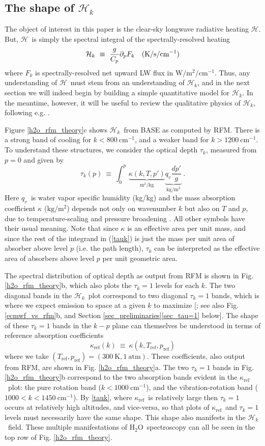 \documentclass{ametsoc}
\newcommand{\beqn}{\begin{equation}}
\newcommand{\eeqn}{\end{equation}}
\newcommand{\eqnref}[1]{(\ref{#1})}
\newcommand{\kg}{\ensuremath{\mathrm{kg}}}
\newcommand{\meter}{\ensuremath{\mathrm{m}}}
\newcommand{\Kelvin}{\ensuremath{\mathrm{K}}}
\newcommand{\Wmsq}{\ensuremath{\mathrm{W/m^2}}}
\newcommand{\cminverse}{\ensuremath{\mathrm{cm^{-1}}}}
\newcommand{\ppp}{\ensuremath{\partial_p}}
\newcommand{\Cp}{\ensuremath{C_p}}
\newcommand{\qv}{\ensuremath{q_v}}
\newcommand{\htwo}{\ensuremath{\mathrm{H_2O}}}
\newcommand{\ch}{\ensuremath{\mathcal{H}}}
\newcommand{\chk}{\ensuremath{\ch_k}}
\newcommand{\tauk}{\ensuremath{\tau_k}}
\newcommand{\kapparef}{\ensuremath{\kappa_{\mathrm{ref}}}}
\newcommand{\Tref}{\ensuremath{T_{\mathrm{ref}}}}
\newcommand{\pref}{\ensuremath{p_{\mathrm{ref}}}}
\begin{document}
\subsection{The shape of \chk}
The object of interest in this paper is the clear-sky longwave radiative heating \ch. But, \ch\ is simply the spectral integral of  the spectrally-resolved heating 
\beqn
	\ch_k \ \equiv \ \frac{g}{\Cp} \ppp F_k \quad \text{(K/s/\cminverse)}
	\label{heat_k}
\eeqn
where $F_k$ is spectrally-resolved net upward LW flux in $\Wmsq/\cminverse$. Thus,  any understanding of \ch\ must stem from an understanding of \chk, and in the next section we will indeed begin by building a simple quantitative model for \chk.  In the meantime, however, it will be useful to review the qualitative physics of \chk, following e.g.  \cite{harries2008,clough1992}.

Figure \ref{h2o_rfm_theory}c shows \chk\ from BASE as computed by RFM. There is a strong band of cooling for $k< 800\ \cminverse$, and a weaker band for $k > 1200\ \cminverse$. To understand these structures, we consider   the optical depth $\tauk$, measured from $p=0$  and given by
\beqn
	\tauk(p) \ \equiv  \ \int_0^p \, \underbrace{\kappa(k,T,p')}_{\meter^2/\kg} \underbrace{\qv \frac{dp'}{g}}_{\kg/\meter^2}\ .
	\label{tauk}
\eeqn
Here \qv\ is water vapor specific humidity (kg/kg) and the mass absorption coefficient $\kappa$ ($\kg/\meter^2$) depends not only on wavenumber $k$ but also on $T$ and $p$,  due to temperature-scaling and pressure broadening \citep[][]{pierrehumbert2010}. All other symbols have their usual meaning. Note that since $\kappa$ is an effective area per unit mass, and since the rest of the integrand in \eqnref{tauk} is just the mass per unit area of absorber above level $p$ (i.e. the path length), $\tauk$ can be interpreted as the effective area of absorbers above level $p$ per unit geometric area.

 The spectral distribution of optical depth as output from RFM is shown in Fig. \ref{h2o_rfm_theory}b, which also plots the $\tauk=1$ levels for each $k$. The two diagonal bands in the \chk\ plot correspond to two diagonal $\tauk=1$ bands, which is where we expect emission to space at a given $k$ to maximize [\cite{jeevanjee2019b,wallace2006,petty2006}; see also  Fig. \ref{ecmwf_vs_rfm}b, and Section \ref{sec_preliminaries}\ref{sec_tau=1} below]. The shape of these $\tauk=1$ bands in the $k-p$ plane can themselves be understood in terms of reference absorption coefficients 
 \beqn
  \kapparef(k)\ \equiv  \ \kappa(k,\Tref,\pref)
  \eeqn
  where we take $(\Tref,\pref)=(300\ \Kelvin, 1\ \text{atm})$. These coefficients, also output from RFM, are shown in  Fig. \ref{h2o_rfm_theory}a. The two $\tauk=1$ bands  in Fig. \ref{h2o_rfm_theory}b correspond to the two absorption bands evident in the \kapparef\ plot: the pure rotation band ($k < 1000\ \cminverse$), and the vibration-rotation band ($1000 < k< 1450 \ \cminverse$). By \eqref{tauk}, where \kapparef\ is relatively large then $\tauk=1$  occurs at relatively high altitudes,  and vice-versa, so that plots of \kapparef\ and $\tauk=1$ levels must necessarily have the same shape. This shape also manifests in the \chk\ field. These multiple manifestations of \htwo\ spectroscopy  can all be seen in the top row of Fig. \ref{h2o_rfm_theory}. 
\end{document}
